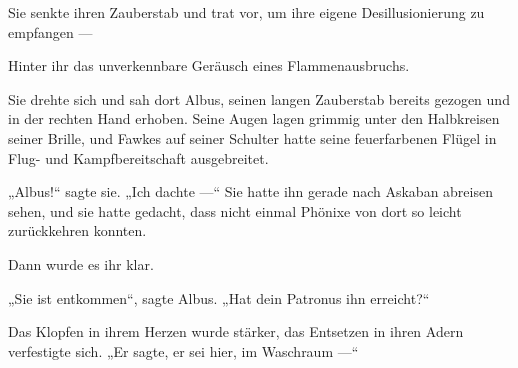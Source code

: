 Sie senkte ihren Zauberstab und trat vor, um ihre eigene Desillusionierung zu empfangen —

Hinter ihr das unverkennbare Geräusch eines Flammenausbruchs.

Sie drehte sich und sah dort Albus, seinen langen Zauberstab bereits gezogen und in der rechten Hand erhoben. Seine Augen lagen grimmig unter den Halbkreisen seiner Brille, und Fawkes auf seiner Schulter hatte seine feuerfarbenen Flügel in Flug- und Kampfbereitschaft ausgebreitet.

„Albus!“ sagte sie.
„Ich dachte —“ Sie hatte ihn gerade nach Askaban abreisen sehen, und sie hatte gedacht, dass nicht einmal Phönixe von dort so leicht zurückkehren konnten.

Dann wurde es ihr klar.

„Sie ist entkommen“, sagte Albus.
„Hat dein Patronus ihn erreicht?“

Das Klopfen in ihrem Herzen wurde stärker, das Entsetzen in ihren Adern verfestigte sich.
„Er sagte, er sei hier, im Waschraum —“

